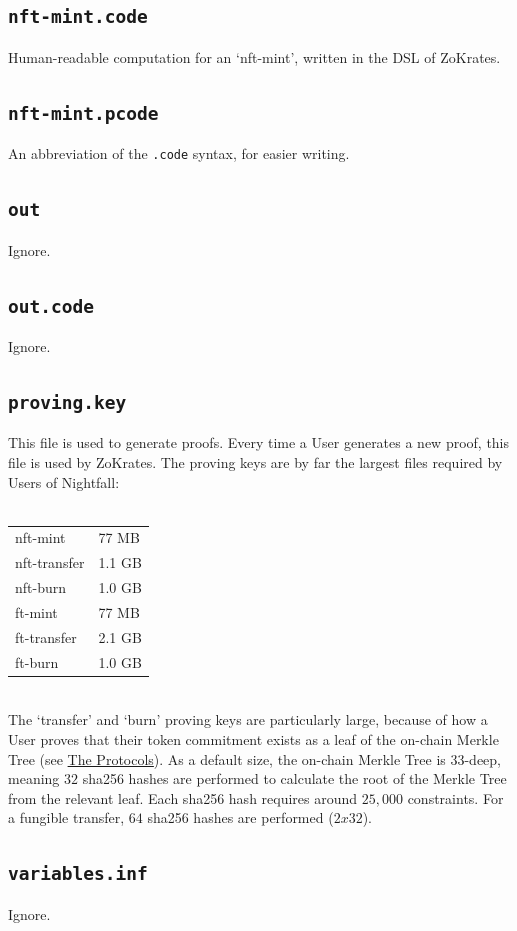 \documentclass{article}
\begin{document}
\subsection*{\texttt{nft-mint.code}}
Human-readable computation for an `nft-mint', written in the DSL of ZoKrates.
\subsection*{\texttt{nft-mint.pcode}}
An abbreviation of the \texttt{.code} syntax, for easier writing.
\subsection*{\texttt{out}}
Ignore.
\subsection*{\texttt{out.code}}
Ignore.
\subsection*{\texttt{proving.key}}
This file is used to generate proofs. Every time a User generates a new proof, this file is used by ZoKrates. The proving keys are by far the largest files required by Users of Nightfall:\\
\\
\begin{tabular}{l l}
  nft-mint & 77 MB\\
  nft-transfer & 1.1 GB\\
  nft-burn & 1.0 GB\\
  ft-mint & 77 MB\\
  ft-transfer & 2.1 GB\\
  ft-burn & 1.0 GB\\
\end{tabular}
\ \\

\noindent
The `transfer' and `burn' proving keys are particularly large, because of how a User proves that their token commitment exists as a leaf of the on-chain Merkle Tree (see \hyperref[part:theProtocols]{The Protocols}). As a default size, the on-chain Merkle Tree is 33-deep, meaning $32$ sha256 hashes are performed to calculate the root of the Merkle Tree from the relevant leaf. Each sha256 hash requires around $25,000$ constraints. For a fungible transfer, $64$ sha256 hashes are performed ($2 x 32$).
\subsection*{\texttt{variables.inf}}
Ignore.
\end{document}
